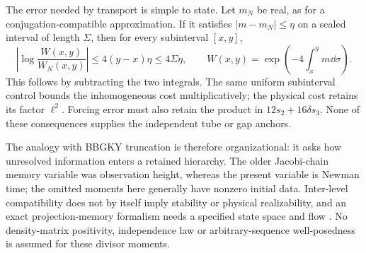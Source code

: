 The error needed by transport is simple to state. Let $m_N$ be real,
as for a conjugation-compatible approximation. If it satisfies $|m-m_N|\le\eta$ on a scaled interval of length $\Sigma$, then
for every subinterval $[x,y]$,
\begin{equation}
 \left|\log\frac{W(x,y)}{W_N(x,y)}\right|
 \le4(y-x)\eta\le4\Sigma\eta,
 \qquad W(x,y)=\exp\left(-4\int_x^y m\dd\sigma\right).
 \label{fin:transport-error}
\end{equation}
This follows by subtracting the two integrals. The same uniform
subinterval control bounds the inhomogeneous cost multiplicatively;
the physical cost retains its factor $\ell^2$. Forcing error must also
retain the product in $12s_2+16\delta s_3$. None of these consequences
supplies the independent tube or gap anchors.

The analogy with BBGKY truncation is therefore organizational: it asks
how unresolved information enters a retained hierarchy. The older
Jacobi-chain memory variable was observation height, whereas the present
variable is Newman time; the omitted moments here generally have nonzero
initial data. Inter-level compatibility does not by itself imply stability
or physical realizability, and an exact projection-memory formalism needs
a specified state space and flow \cite{AkbariEtAl2012Hierarchy,ChorinHaldKupferman2000}.
No density-matrix positivity, independence law or arbitrary-sequence
well-posedness is assumed for these divisor moments.
